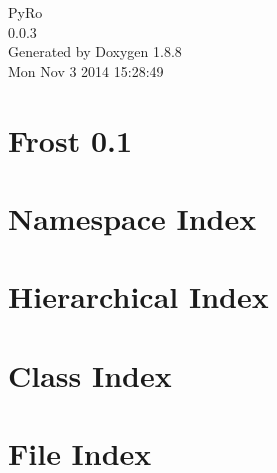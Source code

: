 \documentclass[twoside]{book}
\newcommand{\+}{\discretionary{\mbox{\scriptsize$\hookleftarrow$}}{}{}}
\newcommand{\clearemptydoublepage}{%
  \newpage{\pagestyle{empty}\cleardoublepage}%
}
\begin{document}
\hypersetup{pageanchor=false,
             bookmarks=true,
             bookmarksnumbered=true,
             pdfencoding=unicode
            }
\begin{titlepage}
\vspace*{7cm}
\begin{center}%
{\Large Py\+Ro \\[1ex]\large 0.\+0.\+3 }\\
\vspace*{1cm}
{\large Generated by Doxygen 1.8.8}\\
\vspace*{0.5cm}
{\small Mon Nov 3 2014 15:28:49}\\
\end{center}
\end{titlepage}
\clearemptydoublepage
\tableofcontents
\clearemptydoublepage
{}
\hypersetup{pageanchor=true}

\chapter{Frost 0.1}
\label{md_README}
\hypertarget{md_README}{}

\chapter{Namespace Index}

\chapter{Hierarchical Index}

\chapter{Class Index}

\chapter{File Index}

\end{document}
